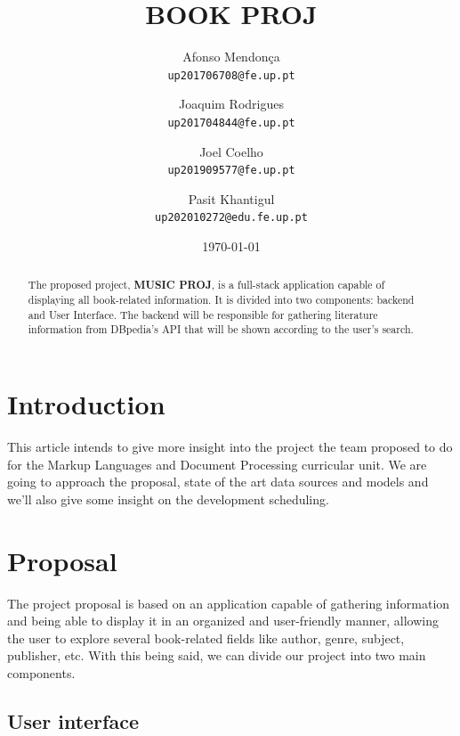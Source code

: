 \documentclass[twocolumn,twoside,11pt,a4paper]{article}
\title{\vspace{-15mm}\fontsize{24pt}{10pt}\selectfont\textbf{BOOK PROJ}} %
\author{Afonso Mendonça\\
\small \texttt{up201706708@fe.up.pt}\\
\and
Joaquim Rodrigues\\
\small \texttt{up201704844@fe.up.pt}
\vspace{-5mm}
\and
Joel Coelho\\
\small \texttt{up201909577@fe.up.pt}
\vspace{-5mm}
\and
Pasit Khantigul\\
\small \texttt{up202010272@edu.fe.up.pt}
\vspace{-5mm}
}
\date{\today}
\begin{document}
\maketitle
\thispagestyle{plain}            %


\begin{abstract}

The proposed project, \textbf{MUSIC PROJ}, is a full-stack application capable of displaying all book-related information. It is divided into two components: backend and User Interface. The backend will be responsible for gathering literature information from DBpedia’s API that will be shown according to the user’s search.

\end{abstract}


\section{Introduction}\label{sec:intro}

This article intends to give more insight into the project the team proposed to do for the Markup Languages and Document Processing curricular unit. We are going to approach the proposal, state of the art data sources and models and we’ll also give some insight on the development scheduling.


\section{Proposal}\label{sec:proposal}

The project proposal is based on an application capable of gathering information and being able to display it in an organized and user-friendly manner, allowing the user to explore several book-related fields like author, genre, subject, publisher, etc. With this being said, we can divide our project into two main components.

\subsection{User interface} \label{userinterface} 
\end{document}
